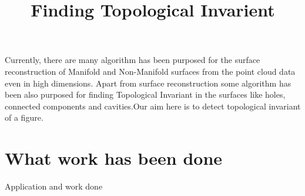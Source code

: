 \documentclass[12pt]{article}
\date{}
\begin{document}
\title{ \bf{ Finding Topological Invarient} }
\maketitle
\setlength{\parindent}{2cm}
Currently, there are many algorithm has been purposed for the surface reconstruction of Manifold and Non-Manifold surfaces from the point cloud data even in high dimensions. Apart from surface reconstruction some algorithm has been also purposed for finding Topological Invariant in the surfaces like holes, connected components and cavities.Our aim here is to detect topological invariant of a figure.
\section{What work has been done}
Application and work done
\end{document}

